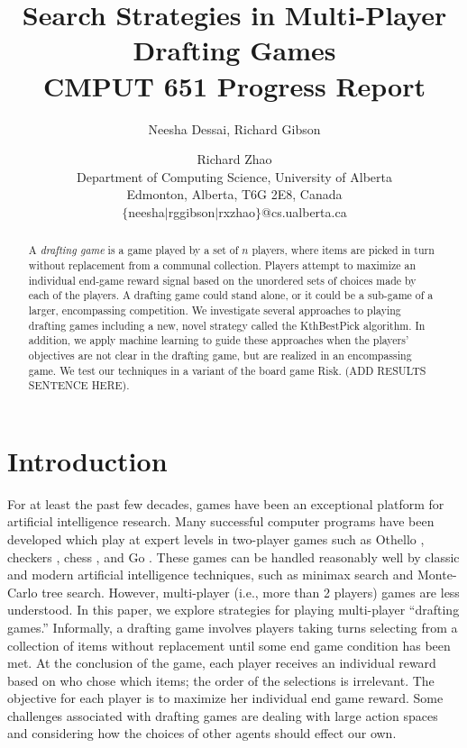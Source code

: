 \documentclass[letterpaper]{article}
\title{Search Strategies in Multi-Player Drafting Games  \\ \small \vspace{0.1cm} CMPUT 651 Progress Report}
\author{Neesha Dessai, Richard Gibson \and Richard Zhao \\
Department of Computing Science, University of Alberta \\
Edmonton, Alberta, T6G 2E8, Canada \\
$\{$neesha$\mid$rggibson$\mid$rxzhao$\}$@cs.ualberta.ca}
\numberwithin{equation}{section}
\numberwithin{theorem}{section}
\numberwithin{lemma}{section}
\numberwithin{df}{section}
\begin{document}
\maketitle

\begin{abstract}
A \emph{drafting game} is a game played by a set of $n$ players, where items are picked in turn without replacement from a communal collection.  Players attempt to maximize an individual end-game reward signal based on the unordered sets of choices made by each of the players.  A drafting game could stand alone, or it could be a sub-game of a larger, encompassing competition.  We investigate several approaches to playing drafting games including a new, novel strategy called the KthBestPick algorithm.  In addition, we apply machine learning to guide these approaches when the players' objectives are not clear in the drafting game, but are realized in an encompassing game.  We test our techniques in a variant of the board game Risk.  (ADD RESULTS SENTENCE HERE).  
\end{abstract}

\section{Introduction}


For at least the past few decades, games have been an exceptional platform for artificial intelligence research.  Many successful computer programs have been developed which play at expert levels in two-player games such as Othello \cite{Othello}, checkers \cite{Chinook}, chess \cite{DeepBlue}, and Go \cite{ComputerGo}.  These games can be handled reasonably well by classic and modern artificial intelligence techniques, such as minimax search and Monte-Carlo tree search.  However, multi-player (i.e., more than 2 players) games are less understood.  In this paper, we explore strategies for playing multi-player ``drafting games.''  Informally, a drafting game involves players taking turns selecting from a collection of items without replacement until some end game condition has been met.  At the conclusion of the game, each player receives an individual reward based on who chose which items; the order of the selections is irrelevant.  The objective for each player is to maximize her individual end game reward.  Some challenges associated with drafting games are dealing with large action spaces and considering how the choices of other agents should effect our own.
\end{document}
